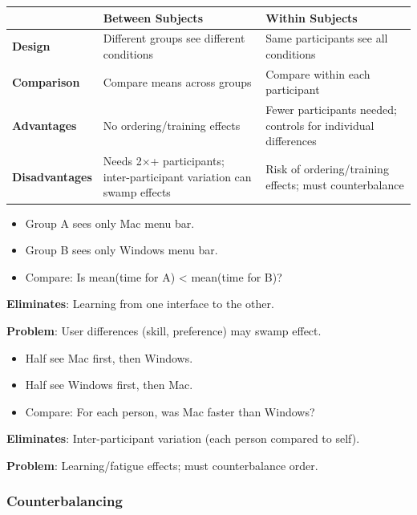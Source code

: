 \begin{center}
\renewcommand{\arraystretch}{1.3}
\begin{tabular}{@{} l p{5.5cm} p{5.5cm} @{}}
\toprule
& \textbf{Between Subjects} & \textbf{Within Subjects} \\
\midrule
\textbf{Design} & Different groups see different conditions & Same participants see all conditions \\
\textbf{Comparison} & Compare means across groups & Compare within each participant \\
\textbf{Advantages} & No ordering/training effects & Fewer participants needed; controls for individual differences \\
\textbf{Disadvantages} & Needs 2$\times$+ participants; inter-participant variation can swamp effects & Risk of ordering/training effects; must counterbalance \\
\bottomrule
\end{tabular}
\end{center}

\begin{exbox}
\begin{itemize}
  \item Group A sees only Mac menu bar.
  \item Group B sees only Windows menu bar.
  \item Compare: Is mean(time for A) < mean(time for B)?
\end{itemize}
\textbf{Eliminates}: Learning from one interface to the other.

\textbf{Problem}: User differences (skill, preference) may swamp effect.
\end{exbox}

\begin{exbox}
\begin{itemize}
  \item Half see Mac first, then Windows.
  \item Half see Windows first, then Mac.
  \item Compare: For each person, was Mac faster than Windows?
\end{itemize}
\textbf{Eliminates}: Inter-participant variation (each person compared to self).

\textbf{Problem}: Learning/fatigue effects; must counterbalance order.
\end{exbox}

\subsubsection*{Counterbalancing}

